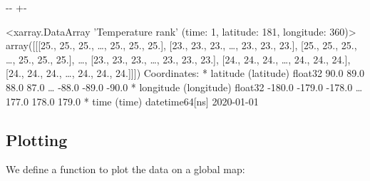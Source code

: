 \documentclass[letterpaper,10pt,english]{sphinxmanual}
\newlength\nbsphinxcodecellspacing
\begin{document}
{

\kern-\sphinxverbatimsmallskipamount\kern-\baselineskip
\kern+\FrameHeightAdjust\kern-\fboxrule
\vspace{\nbsphinxcodecellspacing}

\begin{sphinxVerbatim}[commandchars=\\\{\}]
\llap{\color{nbsphinxout}[17]:\,\hspace{\fboxrule}\hspace{\fboxsep}}<xarray.DataArray 'Temperature rank' (time: 1, latitude: 181, longitude: 360)>
array([[[25., 25., 25., {\ldots}, 25., 25., 25.],
        [23., 23., 23., {\ldots}, 23., 23., 23.],
        [25., 25., 25., {\ldots}, 25., 25., 25.],
        {\ldots},
        [23., 23., 23., {\ldots}, 23., 23., 23.],
        [24., 24., 24., {\ldots}, 24., 24., 24.],
        [24., 24., 24., {\ldots}, 24., 24., 24.]]])
Coordinates:
  * latitude   (latitude) float32 90.0 89.0 88.0 87.0 {\ldots} -88.0 -89.0 -90.0
  * longitude  (longitude) float32 -180.0 -179.0 -178.0 {\ldots} 177.0 178.0 179.0
  * time       (time) datetime64[ns] 2020-01-01
\end{sphinxVerbatim}
}


\subsection{Plotting}
\label{\detokenize{Notebooks/Global_monthly_temperature_records_ERA5:Plotting}}
We define a function to plot the data on a global map:
\end{document}
